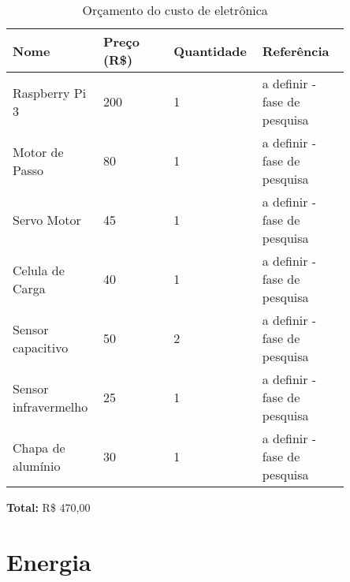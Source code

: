\begin{table}[!ht]
\centering
\caption{Orçamento do custo de eletrônica}
\label{my-label}
\begin{tabular}{|p{0.20\linewidth}|p{0.20\linewidth}|p{0.20\linewidth}|p{0.25\linewidth}|}
\hline
\textbf{Nome}        & \textbf{Preço (R\$)} & \textbf{Quantidade} & \textbf{Referência} \\ \hline
Raspberry Pi 3       & 200                  & 1                   & a definir - fase de pesquisa                    \\ \hline
Motor de Passo       & 80                   & 1                   &  a definir - fase de pesquisa                   \\ \hline
Servo Motor          & 45                   & 1                   &    a definir - fase de pesquisa                 \\ \hline
Celula de Carga      & 40                   & 1                   &  a definir - fase de pesquisa                   \\ \hline
Sensor capacitivo    & 50                   & 2                   & a definir - fase de pesquisa                    \\ \hline
Sensor infravermelho & 25                   & 1                   &  a definir - fase de pesquisa                   \\ \hline
Chapa de alumínio    & 30                   & 1                   &  a definir - fase de pesquisa                   \\ \hline
\end{tabular}
\end{table}

\textbf{Total: } R\$ 470,00

\section{Energia}

